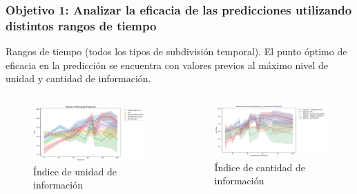 \documentclass{beamer}
\begin{document}
\begin{frame}
	\frametitle{Objetivo 1: Analizar la eficacia de las predicciones utilizando distintos rangos de tiempo}
\begin{block}{Rangos de tiempo (todos los tipos de subdivisión temporal).} 
		El punto óptimo de eficacia en la predicción se encuentra con valores previos al máximo nivel de unidad y cantidad de información. 
	\end{block}
	\begin{columns}[c]
		\begin{column}{.5\textwidth}
			\begin{figure}
				\centering
				\includegraphics[width=1\textwidth]{figs/cap7/figura_12}
				\caption{Índice de unidad de información}
			\end{figure}      
		\end{column}
		\begin{column}{.5\textwidth}
			\begin{figure}
				\centering
				\includegraphics[width=1\textwidth]{figs/cap7/figura_13}
				\caption{Índice de cantidad de información}
			\end{figure}
		\end{column}
	\end{columns}

	
\end{frame}
\end{document}
